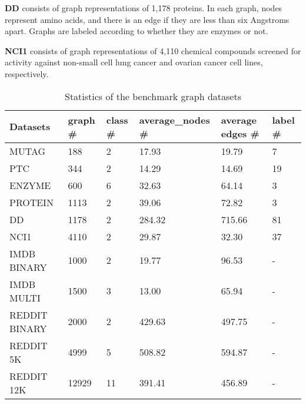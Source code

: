\documentclass[11pt,onecolumn]{article}
\begin{document}
\textbf{DD} \cite{dobson2003distinguishing} consists of graph representations of 1,178 proteins. In each graph, nodes represent amino acids, and there is an edge if they are less than six Angstroms apart. Graphs are labeled according to whether they are enzymes or not.

\textbf{NCI1} \cite{shervashidze2011weisfeiler} consists of graph representations of 4,110 chemical compounds screened for activity against non-small cell lung cancer and ovarian cancer cell lines, respectively.


\begin{table}[]
\centering
\begin{tabular}{@{}llllll@{}}
\toprule
Datasets      & graph \# & class \# & average\_nodes \# & average edges \# & label \# \\ \midrule
MUTAG         & 188      & 2        & 17.93             & 19.79            & 7        \\
PTC           & 344      & 2        & 14.29             & 14.69            & 19       \\
ENZYME        & 600      & 6        & 32.63             & 64.14            & 3        \\
PROTEIN       & 1113     & 2        & 39.06             & 72.82            & 3        \\
DD            & 1178     & 2        & 284.32            & 715.66           &  81        \\
NCI1          & 4110     & 2        & 29.87             & 32.30            & 37       \\
IMDB BINARY   & 1000     & 2        & 19.77             & 96.53            & -        \\
IMDB MULTI    & 1500     & 3        & 13.00             & 65.94            & -        \\
REDDIT BINARY & 2000     & 2        & 429.63            & 497.75           & -        \\
REDDIT 5K     & 4999     & 5        & 508.82            & 594.87           & -        \\
REDDIT 12K    & 12929    & 11       & 391.41            & 456.89           & -        \\ \bottomrule
\end{tabular}
\caption{Statistics of the benchmark graph datasets}
\end{table}

\newpage

\end{document}
